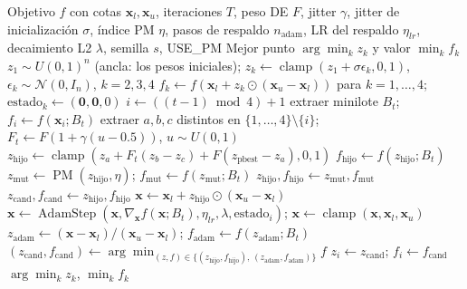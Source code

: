 \begin{algorithm}[H]
\caption{EvE (Evolutionary Explorer)}
\label{alg:eve}
\begin{algorithmic}[1]
\Require Objetivo $f$ con cotas $\mathbf{x}_l, \mathbf{x}_u$, iteraciones $T$, peso DE $F$, jitter $\gamma$, jitter de inicialización $\sigma$, índice PM $\eta$, pasos de respaldo $n_{\text{adam}}$, LR del respaldo $\eta_{lr}$, decaimiento L2 $\lambda$, semilla $s$, USE\_PM
\Ensure Mejor punto $\arg\min_k z_k$ y valor $\min_k f_k$
\State $z_1 \sim U(0,1)^n$ (ancla: los pesos iniciales); $z_k \gets \operatorname{clamp}(z_1 + \sigma\epsilon_k, 0, 1)$, $\epsilon_k \sim \mathcal{N}(0, I_n)$, $k = 2,3,4$ 
\State $f_k \gets f(\mathbf{x}_l + z_k \odot (\mathbf{x}_u - \mathbf{x}_l))$ para $k = 1,\dots,4$; $\text{estado}_k \gets (\mathbf{0}, \mathbf{0}, 0)$ 
    \State $i \gets ((t - 1) \bmod 4) + 1$ 
    \State extraer minilote $B_t$; $f_i \gets f(\mathbf{x}_i; B_t)$ 
    \State extraer $a, b, c$ distintos en $\{1,\dots,4\} \setminus \{i\}$; $F_t \gets F(1 + \gamma(u - 0.5))$, $u \sim U(0,1)$
    \State $z_{\text{hijo}} \gets \operatorname{clamp}(z_a + F_t(z_b - z_c) + F(z_{\text{pbest}} - z_a), 0, 1)$
    \State $f_{\text{hijo}} \gets f(z_{\text{hijo}}; B_t)$
     
        \State $z_{\text{mut}} \gets \operatorname{PM}(z_{\text{hijo}}, \eta)$; $f_{\text{mut}} \gets f(z_{\text{mut}}; B_t)$
         $z_{\text{hijo}}, f_{\text{hijo}} \gets z_{\text{mut}}, f_{\text{mut}}$ \EndIf
    \EndIf
        \State $z_{\text{cand}}, f_{\text{cand}} \gets z_{\text{hijo}}, f_{\text{hijo}}$
    \Else
        \State $\mathbf{x} \gets \mathbf{x}_l + z_{\text{hijo}} \odot (\mathbf{x}_u - \mathbf{x}_l)$
         
            \State $\mathbf{x} \gets \operatorname{AdamStep}(\mathbf{x}, \nabla_{\mathbf{x}} f(\mathbf{x}; B_t), \eta_{lr}, \lambda, \text{estado}_i)$; \quad $\mathbf{x} \gets \operatorname{clamp}(\mathbf{x}, \mathbf{x}_l, \mathbf{x}_u)$
        \EndFor
        \State $z_{\text{adam}} \gets (\mathbf{x} - \mathbf{x}_l)/(\mathbf{x}_u - \mathbf{x}_l)$; \quad $f_{\text{adam}} \gets f(z_{\text{adam}}; B_t)$
        \State $(z_{\text{cand}}, f_{\text{cand}}) \gets \arg\min_{(z, f) \in \{(z_{\text{hijo}}, f_{\text{hijo}}),\, (z_{\text{adam}}, f_{\text{adam}})\}} f$
    \EndIf
     $z_i \gets z_{\text{cand}}$; \quad $f_i \gets f_{\text{cand}}$  \EndIf
\EndFor
\State \Return $\arg\min_k z_k$, $\min_k f_k$
\end{algorithmic}
\end{algorithm}

